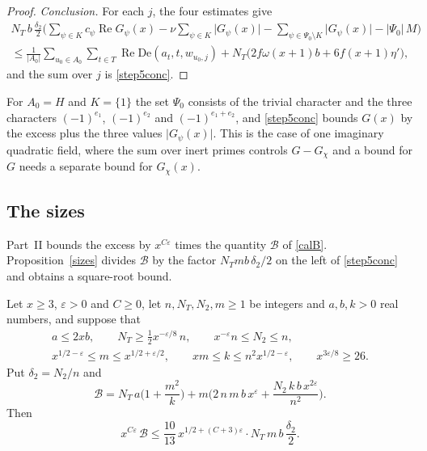 \begin{proof}
\emph{Conclusion.} For each $j$, the four estimates give
\begin{multline*}
N_T\,b\,\frac{\delta_2}2\Big(\sum_{\psi\in K}c_\psi\operatorname{Re}G_\psi(x)-\nu\sum_{\psi\in K}\lvert G_\psi(x)\rvert-\sum_{\psi\in\Psi_0\setminus K}\lvert G_\psi(x)\rvert-\lvert\Psi_0\rvert\,M\Big)\\
\le\frac1{\lvert A_0\rvert}\sum_{u_0\in A_0}\sum_{t\in T}\operatorname{Re}\mathrm{De}(a_t,t,w_{u_0,j})+N_T\Big(2f\omega(x+1)b+6f(x+1)\eta'\Big),
\end{multline*}
and the sum over $j$ is \eqref{step5conc}.
\end{proof}

For $A_0=H$ and $K=\{1\}$ the set $\Psi_0$ consists of the trivial character and the three characters $(-1)^{e_1}$, $(-1)^{e_2}$ and $(-1)^{e_1+e_2}$, and \eqref{step5conc} bounds $G(x)$ by the excess plus the three values $\lvert G_\psi(x)\rvert$. This is the case of one imaginary quadratic field, where the sum over inert primes controls $G-G_\chi$ and a bound for $G$ needs a separate bound for $G_\chi(x)$.

\subsection{The sizes}\label{sec:sizes}

Part~II bounds the excess by $x^{C\varepsilon}$ times the quantity $\mathcal B$ of \eqref{calB}. Proposition~\ref{sizes} divides $\mathcal B$ by the factor $N_Tmb\,\delta_2/2$ on the left of \eqref{step5conc} and obtains a square-root bound.

\begin{proposition}\label{sizes}
Let $x\ge3$, $\varepsilon>0$ and $C\ge0$, let $n,N_T,N_2,m\ge1$ be integers and $a,b,k>0$ real numbers, and suppose that
\begin{gather}
a\le2xb,\qquad N_T\ge\tfrac12x^{-\varepsilon/8}\,n,\qquad x^{-\varepsilon}n\le N_2\le n,\label{sz1}\\
x^{1/2-\varepsilon}\le m\le x^{1/2+\varepsilon/2},\qquad xm\le k\le n^2x^{1/2-\varepsilon},\qquad x^{3\varepsilon/8}\ge26.\label{sz2}
\end{gather}
Put $\delta_2=N_2/n$ and
\begin{equation}\label{calB}
\mathcal B=N_T\,a\Big(1+\frac{m^2}k\Big)+m\Big(2\,n\,m\,b\,x^{\varepsilon}+\frac{N_2\,k\,b\,x^{2\varepsilon}}{n^2}\Big).
\end{equation}
Then
\[
x^{C\varepsilon}\,\mathcal B\le\frac{10}{13}\,x^{1/2+(C+3)\varepsilon}\cdot N_T\,m\,b\,\frac{\delta_2}2 .
\]
\end{proposition}

